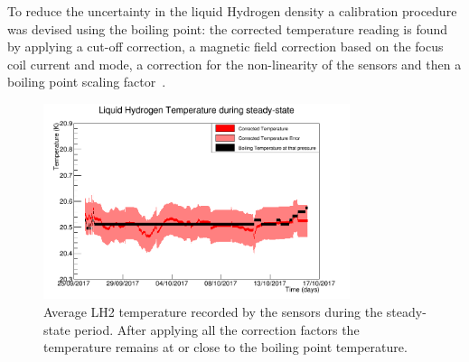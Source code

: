 To reduce the uncertainty in the liquid Hydrogen density a calibration procedure was devised using the boiling point: the corrected temperature reading is found by applying a cut-off correction, a magnetic field correction based on the focus coil current and mode, a correction for the non-linearity of the sensors and then a boiling point scaling factor~\cite{NOTE524}. 
%
%

\begin{figure}[htb!]
  \begin{center}
  \includegraphics[width=0.80\textwidth]{11-Absorber/Figures/SteadyState60mK.png}
  \end{center}
  \caption{Average LH2 temperature recorded by the sensors during the steady-state period. After applying all the correction factors the temperature remains at or close to the boiling point temperature.}
  \label{Fig:TempCalibrated}
\end{figure}
 
